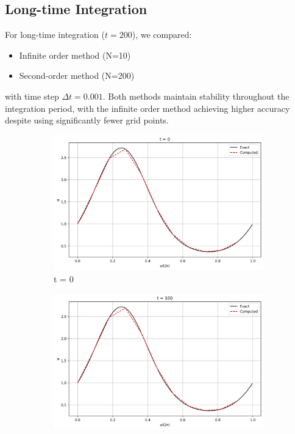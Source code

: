 \documentclass{article}
\begin{document}
\subsection{Long-time Integration}
For long-time integration ($t=200$), we compared:
\begin{itemize}
    \item Infinite order method (N=10)
    \item Second-order method (N=200)
\end{itemize}
with time step $\Delta t = 0.001$. Both methods maintain stability throughout the integration period, with the infinite order method achieving higher accuracy despite using significantly fewer grid points.

\begin{figure}[htbp]
    \centering
    \begin{subfigure}[b]{0.32\textwidth}
        \includegraphics[width=\textwidth]{figures/long_time_infinite_0.png}
        \caption{t = 0}
    \end{subfigure}
    \begin{subfigure}[b]{0.32\textwidth}
        \includegraphics[width=\textwidth]{figures/long_time_infinite_100.png}

\end{subfigure}
\end{figure}
\end{document}
